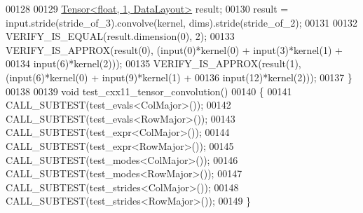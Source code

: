 \begin{DoxyCode}
00128 
00129   \hyperlink{class_eigen_1_1_tensor}{Tensor<float, 1, DataLayout>} result;
00130   result = input.stride(stride\_of\_3).convolve(kernel, dims).stride(stride\_of\_2);
00131 
00132   VERIFY\_IS\_EQUAL(result.dimension(0), 2);
00133   VERIFY\_IS\_APPROX(result(0), (input(0)*kernel(0) + input(3)*kernel(1) +
00134                                input(6)*kernel(2)));
00135   VERIFY\_IS\_APPROX(result(1), (input(6)*kernel(0) + input(9)*kernel(1) +
00136                                input(12)*kernel(2)));
00137 \}
00138 
00139 \textcolor{keywordtype}{void} test\_cxx11\_tensor\_convolution()
00140 \{
00141   CALL\_SUBTEST(test\_evals<ColMajor>());
00142   CALL\_SUBTEST(test\_evals<RowMajor>());
00143   CALL\_SUBTEST(test\_expr<ColMajor>());
00144   CALL\_SUBTEST(test\_expr<RowMajor>());
00145   CALL\_SUBTEST(test\_modes<ColMajor>());
00146   CALL\_SUBTEST(test\_modes<RowMajor>());
00147   CALL\_SUBTEST(test\_strides<ColMajor>());
00148   CALL\_SUBTEST(test\_strides<RowMajor>());
00149 \}
\end{DoxyCode}
